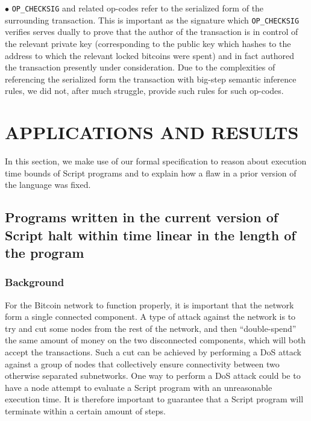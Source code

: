 \documentclass[letterpaper, 10 pt, conference]{ieeeconf}
\begin{document}
$\bullet$ \texttt{OP\_CHECKSIG} and related op-codes refer to the serialized form of the surrounding transaction. This is important as the signature which \texttt{OP\_CHECKSIG} verifies serves dually to prove that the author of the transaction is in control of the relevant private key (corresponding to the public key which hashes to the address to which the relevant locked bitcoins were spent) and in fact authored the transaction presently under consideration. Due to the complexities of referencing the serialized form the transaction with big-step semantic inference rules, we did not, after much struggle, provide such rules for such op-codes.

\section{APPLICATIONS AND RESULTS}

In this section, we make use of our formal specification to reason about execution time bounds of Script programs and to explain how a flaw in a prior version of the language was fixed.

\subsection{Programs written in the current version of Script halt within time linear in the length of the program}

\subsubsection{Background}
For the Bitcoin network to function properly, it is important that the network form a single connected component. A type of attack against the network is to try and cut some nodes from the rest of the network, and then ``double-spend'' the same amount of money on the two disconnected components, which will both accept the transactions. Such a cut can be achieved by performing a DoS attack against a group of nodes that collectively ensure connectivity between two otherwise separated subnetworks. One way to perform a DoS attack could be to have a node attempt to evaluate a Script program with an unreasonable execution time. It is therefore important to guarantee that a Script program will terminate within a certain amount of steps.
\end{document}

